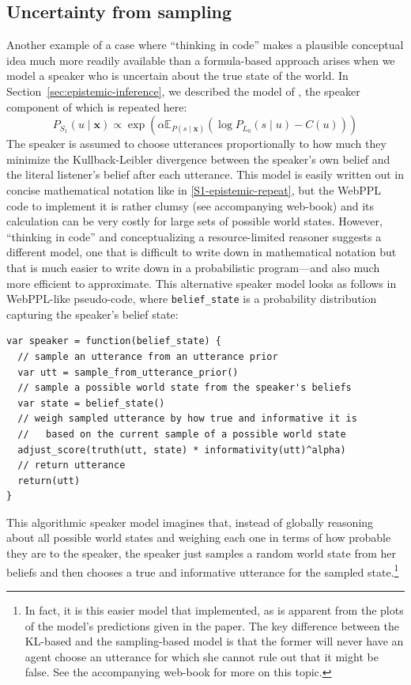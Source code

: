 \documentclass{sp}
\begin{document}
\subsection{Uncertainty from sampling}

Another example of a case where ``thinking in code'' makes a plausible conceptual idea much more readily available than a formula-based approach arises when we model a speaker who is uncertain about the true state of the world.
In Section~\ref{sec:epistemic-inference}, we described the model of \cite{goodmanstuhlmuller2013}, the speaker component of which is repeated here:
%
\begin{equation} \label{S1-epistemic-repeat}
P_{S_1}(u\mid \textbf{x}) \propto \exp (\alpha \mathbb{E}_{P(s\mid \textbf{x})}(\log P_{L_0}(s\mid u) - C(u)))
\end{equation}
%
The speaker is assumed to choose utterances proportionally to how much they minimize the Kullback-Leibler divergence between the speaker's own belief and the literal listener's belief after each utterance.
This model is easily written out in concise mathematical notation like in \autoref{S1-epistemic-repeat}, but the WebPPL code to implement it is rather clumsy (see accompanying web-book) and its calculation can be very costly for large sets of possible world states.
However, ``thinking in code'' and conceptualizing a resource-limited reasoner suggests a different model, one that is difficult to write down in mathematical notation but that is much easier to write down in a probabilistic program---and also much more efficient to approximate.
This alternative speaker model looks as follows in WebPPL-like pseudo-code, where \verb|belief_state| is a probability distribution capturing the speaker's belief state:
\begin{lstlisting}
var speaker = function(belief_state) {
  // sample an utterance from an utterance prior
  var utt = sample_from_utterance_prior()
  // sample a possible world state from the speaker's beliefs
  var state = belief_state()
  // weigh sampled utterance by how true and informative it is
  //   based on the current sample of a possible world state
  adjust_score(truth(utt, state) * informativity(utt)^alpha)
  // return utterance
  return(utt)
}
\end{lstlisting}
This algorithmic speaker model imagines that, instead of globally reasoning about all possible world states and weighing each one in terms of how probable they are to the speaker, the speaker just samples a random world state from her beliefs and then chooses a true and informative utterance for the sampled state.\footnote{In fact, it is this easier model that \citet{goodmanstuhlmuller2013} implemented, as is apparent from the plots of the model's predictions given in the paper. The key difference between the KL-based and the sampling-based model is that the former will never have an agent choose an utterance for which she cannot rule out that it might be false. See the accompanying web-book for more on this topic.}
\end{document}
